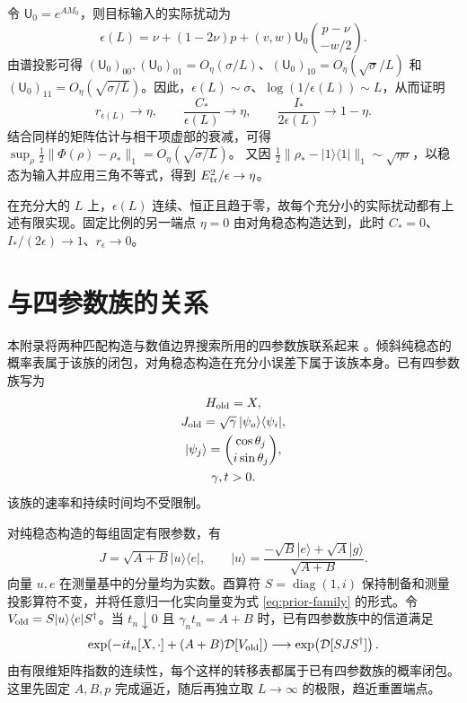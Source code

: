 \documentclass[aps,pra,reprint,amsmath,amssymb,nofootinbib,floatfix,longbibliography]{revtex4-2}
\theoremstyle{aps}
\DeclareMathOperator{\diag}{diag}
\newcommand{\Diss}{\mathcal D}
\newcommand{\eps}{\epsilon}
\newcommand{\ket}[1]{|#1\rangle}
\newcommand{\bra}[1]{\langle#1|}
\newcommand{\proj}[1]{|#1\rangle\langle#1|}
\begin{document}
令 $\mathsf U_0=e^{AM_0}$，则目标输入的实际扰动为
\begin{equation}\label{eq:fraction-actual}
 \eps(L)=\nu+(1-2\nu)p+(v,w)\mathsf U_0\binom{p-\nu}{-w/2}.
\end{equation}
由谱投影可得 $(\mathsf U_0)_{00},(\mathsf U_0)_{01}=O_\eta(\sigma/L)$、$(\mathsf U_0)_{10}=O_\eta(\sqrt\sigma/L)$ 和 $(\mathsf U_0)_{11}=O_\eta(\sqrt{\sigma/L})$。因此，$\eps(L)\sim\sigma$、$\log(1/\eps(L))\sim L$，从而证明
\begin{equation}\label{eq:fraction-matching}
 r_{\eps(L)}\to\eta,\qquad
 \frac{C_*}{\eps(L)}\to\eta,\qquad
 \frac{I_*}{2\eps(L)}\to1-\eta.
\end{equation}
结合同样的矩阵估计与相干项虚部的衰减，可得
$\sup_\rho\tfrac12\|\Phi(\rho)-\rho_*\|_1=O_\eta(\sqrt{\sigma/L})$。
又因 $\tfrac12\|\rho_*-\proj1\|_1\sim\sqrt{\eta\sigma}$，以稳态为输入并应用三角不等式，得到 $E_{\rm tr}^2/\eps\to\eta$。

在充分大的 $L$ 上，$\eps(L)$ 连续、恒正且趋于零，故每个充分小的实际扰动都有上述有限实现。固定比例的另一端点 $\eta=0$ 由对角稳态构造达到，此时 $C_*=0$、$I_*/(2\eps)\to1$、$r_\eps\to0$。

\section{与四参数族的关系}\label{app:prior-family}

本附录将两种匹配构造与数值边界搜索所用的四参数族联系起来 \cite{Shahbeigi2024}。倾斜纯稳态的概率表属于该族的闭包，对角稳态构造在充分小误差下属于该族本身。已有四参数族写为
\begin{equation}\label{eq:prior-family}
 \begin{gathered}
 H_{\rm old}=X,\\
 J_{\rm old}=\sqrt\gamma\,\ket{\psi_o}\bra{\psi_i},\\
 \ket{\psi_j}=\binom{\cos\theta_j}{i\sin\theta_j},
 \\ \gamma,t>0.
 \end{gathered}
\end{equation}
该族的速率和持续时间均不受限制。

对纯稳态构造的每组固定有限参数，有
\begin{equation}\label{eq:prior-pure-rankone}
 J=\sqrt{A+B}\ket u\bra e,\qquad
 \ket u=\frac{-\sqrt B\ket e+\sqrt A\ket g}{\sqrt{A+B}}.
\end{equation}
向量 $u,e$ 在测量基中的分量均为实数。酉算符 $S=\diag(1,i)$ 保持制备和测量投影算符不变，并将任意归一化实向量变为式 \eqref{eq:prior-family} 的形式。令 $V_{\rm old}=S\ket u\bra eS^\dagger$。当 $t_n\downarrow0$ 且 $\gamma_nt_n=A+B$ 时，已有四参数族中的信道满足
\begin{equation}\label{eq:prior-pure-limit}
 \exp\!\left(-it_n[X,\cdot]+(A+B)\Diss[V_{\rm old}]\right)
 \longrightarrow \exp\!\left(\Diss[SJS^\dagger]\right).
\end{equation}
由有限维矩阵指数的连续性，每个这样的转移表都属于已有四参数族的概率闭包。这里先固定 $A,B,p$ 完成逼近，随后再独立取 $L\to\infty$ 的极限，趋近重置端点。
\end{document}
